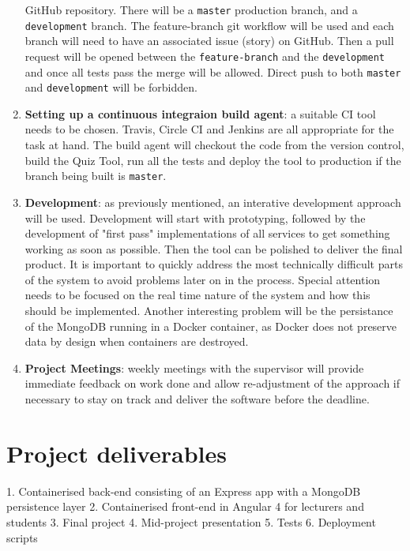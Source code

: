 \documentclass[11pt,fleqn,twoside]{article}
\begin{document}
\begin{enumerate}
    GitHub repository. There will be a \texttt{master} production branch, and a \texttt{development} branch.
    The feature-branch git workflow will be used and each branch will need to have an associated issue (story)
    on GitHub. Then a pull request will be opened between the \texttt{feature-branch} and the \texttt{development}
    and once all tests pass the merge will be allowed. Direct push to both \texttt{master} and \texttt{development}
    will be forbidden.
  \item \textbf{Setting up a continuous integraion build agent}: a suitable CI tool needs to be chosen. Travis, Circle CI
    and Jenkins are all appropriate for the task at hand. The build agent will checkout the code from the version control,
    build the Quiz Tool, run all the tests and deploy the tool to production if the branch being built is \texttt{master}.
  \item \textbf{Development}: as previously mentioned, an interative development approach will be used. Development will start
    with prototyping, followed by the development of "first pass" implementations of all services to get something
    working as soon as possible. Then the tool can be polished to deliver the final product. It is important to quickly
    address the most technically difficult parts of the system to avoid problems later on in the process. Special
    attention needs to be focused on the real time nature of the system and how this should be implemented. Another
    interesting problem will be the persistance of the MongoDB running in a Docker container, as Docker does not
    preserve data by design when containers are destroyed.
  \item \textbf{Project Meetings}: weekly meetings with the supervisor will provide immediate feedback on work done
    and allow re-adjustment of the approach if necessary to stay on track and deliver the software before the deadline.
\end{enumerate}

\section{Project deliverables}
1. Containerised back-end consisting of an Express app with a MongoDB persistence layer
2. Containerised front-end in Angular 4 for lecturers and students
3. Final project
4. Mid-project presentation
5. Tests
6. Deployment scripts
\end{document}
